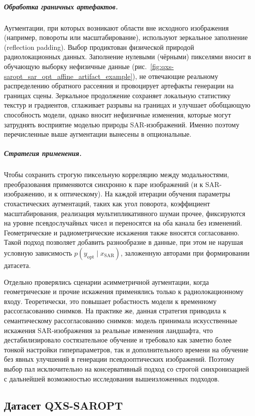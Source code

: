 \subparagraph{Обработка граничных артефактов.}
Аугментации, при которых возникают области вне исходного изображения (например, повороты или масштабирование), используют зеркальное заполнение (reflection padding).
Выбор продиктован физической природой радиолокационных данных.
Заполнение нулевыми (чёрными) пикселями вносит в обучающую выборку нефизичные данные (рис.~\ref{fig:qxs-saropt_sar_opt_affine_artifact_example}), не отвечающие реальному распределению обратного рассеяния и провоцирует артефакты генерации на границах сцены.
Зеркальное продолжение сохраняет локальную статистику текстур и градиентов, сглаживает разрывы на границах и улучшает обобщающую способность модели, однако вносит нефизичные изменения, которые могут затруднять восприятие моделью природы SAR-изображений.
Именно поэтому перечисленные выше аугментации вынесены в опциональные.

\subparagraph{Стратегия применения.}
Чтобы сохранить строгую пиксельную корреляцию между модальностями, преобразования применяются синхронно к паре изображений (и к SAR-изображению, и к оптическому).
На каждой итерации обучения параметры стохастических аугментаций, таких как угол поворота, коэффициент масштабирования, реализация мультипликативного шумаи прочее, фиксируются на уровне псевдослучайных чисел и переносятся на оба канала без изменений.
Геометрические и радиометрические искажения также вносятся согласованно.
Такой подход позволяет добавить разнообразие в данные, при этом не нарушая условную зависимость $p(y_{\text{opt}} \mid x_{\text{SAR}})$, заложенную авторами при формировании датасета.

Отдельно проверялись сценарии асимметричной аугментации, когда геометрические и прочие искажения применялись только к радиолокационному входу.
Теоретически, это повышает робастность модели к временному рассогласованию снимков.
На практике же, данная стратегия приводила к семантическому рассогласованию снимков: модель принимала искусственные искажения SAR-изображения за реальные изменения ландшафта, что дестабилизировало состязательное обучение и требовало как заметно более тонкой настройки гиперпараметров, так и дополнительного времени на обучение без явных улучшений в генерации псевдооптических изображений.
Поэтому выбор пал исключительно на консервативный подход со строгой синхронизацией с дальнейшей возможностью исследования вышеизложенных подходов.

\subsection{Датасет QXS-SAROPT}
\label{subsec:qxs-saropt}

